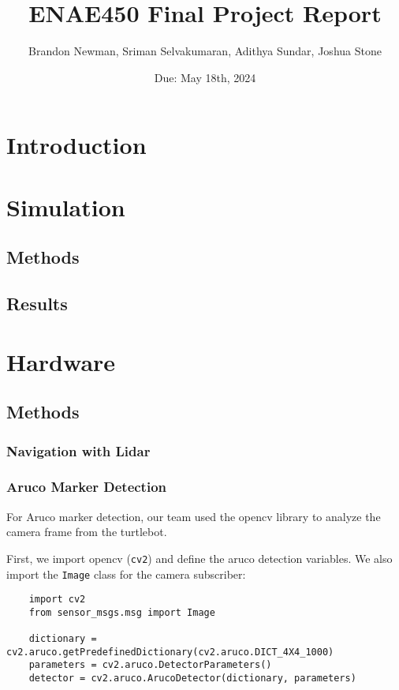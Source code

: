 \documentclass{article}
\title{ENAE450 Final Project Report}
\author{Brandon Newman, Sriman Selvakumaran, Adithya Sundar, Joshua Stone}
\date{Due: May 18th, 2024}
\begin{document}
\maketitle

\section{Introduction}

\section{Simulation}

\subsection{Methods}

\subsection{Results}

\section{Hardware}

\subsection{Methods}

\subsubsection{Navigation with Lidar}

\subsubsection{Aruco Marker Detection}

For Aruco marker detection, our team used the opencv library to analyze the camera frame from the turtlebot. \par

First, we import opencv (\verb|cv2|) and define the aruco detection variables. We also import the \verb|Image| class for the camera subscriber:

\begin{lstlisting}
    import cv2
    from sensor_msgs.msg import Image

    dictionary = cv2.aruco.getPredefinedDictionary(cv2.aruco.DICT_4X4_1000)
    parameters = cv2.aruco.DetectorParameters()
    detector = cv2.aruco.ArucoDetector(dictionary, parameters)
\end{lstlisting}
\end{document}
